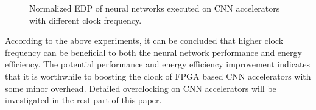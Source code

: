 \begin{figure}
	\vspace{-1em}
    \caption{Normalized EDP of neural networks executed on CNN accelerators with different clock frequency.}
\label{fig:edp}
\vspace{-1em}
\end{figure}

According to the above experiments, it can be concluded that higher clock frequency 
can be beneficial to both the neural network performance and energy efficiency. The 
potential performance and energy efficiency improvement indicates that it is 
worthwhile to boosting the clock of FPGA based CNN accelerators with some minor 
overhead. Detailed overclocking on CNN accelerators will be investigated in 
the rest part of this paper. 
